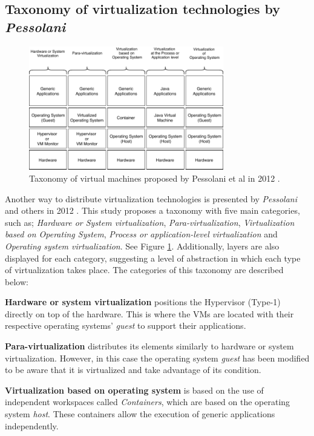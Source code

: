 	\subsection{Taxonomy of virtualization technologies by \textit{Pessolani}}
	
	\begin{figure}[H]
		\centering
		\includegraphics[width=8.5cm]{images/Pessolani2012.pdf}
		\vspace{-0.2cm}
		\caption{Taxonomy of virtual machines proposed by Pessolani et al in 2012 \cite{Pessolani2012}.}
		\label{fig:TaxonomiaDeTecnologiasDeVirtualizacion}
	\end{figure}
	
	Another way to distribute virtualization technologies is presented by \textit{Pessolani} and others in 2012 \cite{Pessolani2012}.  This study proposes a taxonomy with five main categories, such as; \textit{Hardware or System virtualization}, \textit{Para-virtualization}, \textit{Virtualization based on Operating System}, \textit{Process or application-level virtualization} and \textit{Operating system virtualization}. See Figure \ref{fig:TaxonomiaDeTecnologiasDeVirtualizacion}. Additionally, layers are also displayed for each category, suggesting a level of abstraction in which each type of virtualization takes place. The categories of this taxonomy are described below:
	
		\textbf{Hardware or system virtualization} positions the Hypervisor (Type-1) directly on top of the hardware. This is where the VMs are located with their respective operating systems' \textit{guest} to support their applications.
		
		\textbf{Para-virtualization} distributes its elements similarly to hardware or system virtualization. However, in this case the operating system \textit{guest} has been modified to be aware that it is virtualized and take advantage of its condition.
		
		\textbf{Virtualization based on operating system} is based on the use of independent workspaces called \textit{Containers}, which are based on the operating system \textit{host}. These containers allow the execution of generic applications independently.
		
